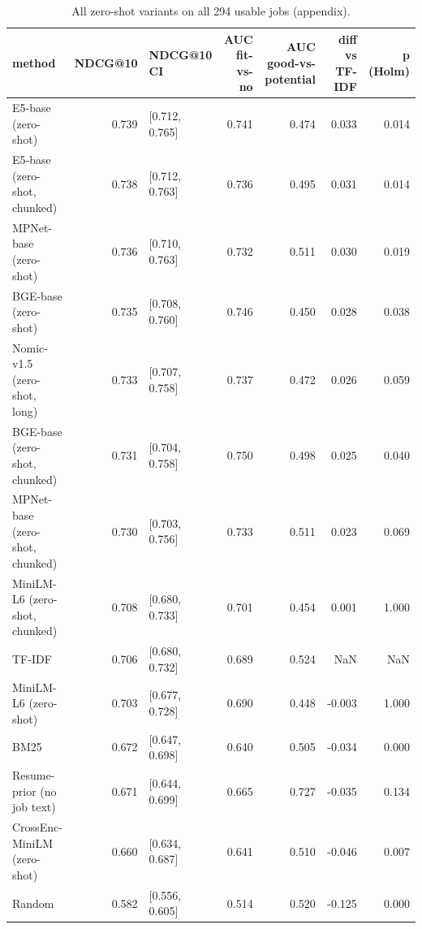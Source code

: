 \begin{table}
\caption{All zero-shot variants on all 294 usable jobs (appendix).}
\label{tab:t3_zero_shot_full}
\begin{tabular}{lrlrrrr}
\toprule
method & NDCG@10 & NDCG@10 CI & AUC fit-vs-no & AUC good-vs-potential & diff vs TF-IDF & p (Holm) \\
\midrule
E5-base (zero-shot) & 0.739 & [0.712, 0.765] & 0.741 & 0.474 & 0.033 & 0.014 \\
E5-base (zero-shot, chunked) & 0.738 & [0.712, 0.763] & 0.736 & 0.495 & 0.031 & 0.014 \\
MPNet-base (zero-shot) & 0.736 & [0.710, 0.763] & 0.732 & 0.511 & 0.030 & 0.019 \\
BGE-base (zero-shot) & 0.735 & [0.708, 0.760] & 0.746 & 0.450 & 0.028 & 0.038 \\
Nomic-v1.5 (zero-shot, long) & 0.733 & [0.707, 0.758] & 0.737 & 0.472 & 0.026 & 0.059 \\
BGE-base (zero-shot, chunked) & 0.731 & [0.704, 0.758] & 0.750 & 0.498 & 0.025 & 0.040 \\
MPNet-base (zero-shot, chunked) & 0.730 & [0.703, 0.756] & 0.733 & 0.511 & 0.023 & 0.069 \\
MiniLM-L6 (zero-shot, chunked) & 0.708 & [0.680, 0.733] & 0.701 & 0.454 & 0.001 & 1.000 \\
TF-IDF & 0.706 & [0.680, 0.732] & 0.689 & 0.524 & NaN & NaN \\
MiniLM-L6 (zero-shot) & 0.703 & [0.677, 0.728] & 0.690 & 0.448 & -0.003 & 1.000 \\
BM25 & 0.672 & [0.647, 0.698] & 0.640 & 0.505 & -0.034 & 0.000 \\
Resume-prior (no job text) & 0.671 & [0.644, 0.699] & 0.665 & 0.727 & -0.035 & 0.134 \\
CrossEnc-MiniLM (zero-shot) & 0.660 & [0.634, 0.687] & 0.641 & 0.510 & -0.046 & 0.007 \\
Random & 0.582 & [0.556, 0.605] & 0.514 & 0.520 & -0.125 & 0.000 \\
\bottomrule
\end{tabular}
\end{table}
